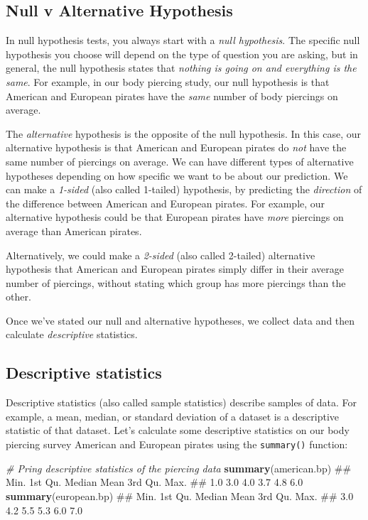 \documentclass[]{book}
\newenvironment{Shaded}{\begin{snugshade}}{\end{snugshade}}
\newcommand{\KeywordTok}[1]{\textcolor[rgb]{0.13,0.29,0.53}{\textbf{#1}}}
\newcommand{\CommentTok}[1]{\textcolor[rgb]{0.56,0.35,0.01}{\textit{#1}}}
\newcommand{\NormalTok}[1]{#1}
\theoremstyle{definition}
\theoremstyle{definition}
\theoremstyle{remark}
\begin{document}
\subsection{Null v Alternative
Hypothesis}\label{null-v-alternative-hypothesis}

In null hypothesis tests, you always start with a \emph{null
hypothesis}. The specific null hypothesis you choose will depend on the
type of question you are asking, but in general, the null hypothesis
states that \emph{nothing is going on and everything is the same}. For
example, in our body piercing study, our null hypothesis is that
American and European pirates have the \emph{same} number of body
piercings on average.

The \emph{alternative} hypothesis is the opposite of the null
hypothesis. In this case, our alternative hypothesis is that American
and European pirates do \emph{not} have the same number of piercings on
average. We can have different types of alternative hypotheses depending
on how specific we want to be about our prediction. We can make a
\emph{1-sided} (also called 1-tailed) hypothesis, by predicting the
\emph{direction} of the difference between American and European
pirates. For example, our alternative hypothesis could be that European
pirates have \emph{more} piercings on average than American pirates.

Alternatively, we could make a \emph{2-sided} (also called 2-tailed)
alternative hypothesis that American and European pirates simply differ
in their average number of piercings, without stating which group has
more piercings than the other.

Once we've stated our null and alternative hypotheses, we collect data
and then calculate \emph{descriptive} statistics.

\subsection{Descriptive statistics}\label{descriptive-statistics-1}

Descriptive statistics (also called sample statistics) describe samples
of data. For example, a mean, median, or standard deviation of a dataset
is a descriptive statistic of that dataset. Let's calculate some
descriptive statistics on our body piercing survey American and European
pirates using the \texttt{summary()} function:

\begin{Shaded}
\begin{Highlighting}[]
\CommentTok{# Pring descriptive statistics of the piercing data}
\KeywordTok{summary}\NormalTok{(american.bp)}
\NormalTok{##    Min. 1st Qu.  Median    Mean 3rd Qu.    Max. }
\NormalTok{##     1.0     3.0     4.0     3.7     4.8     6.0}
\KeywordTok{summary}\NormalTok{(european.bp)}
\NormalTok{##    Min. 1st Qu.  Median    Mean 3rd Qu.    Max. }
\NormalTok{##     3.0     4.2     5.5     5.3     6.0     7.0}
\end{Highlighting}
\end{Shaded}
\end{document}
